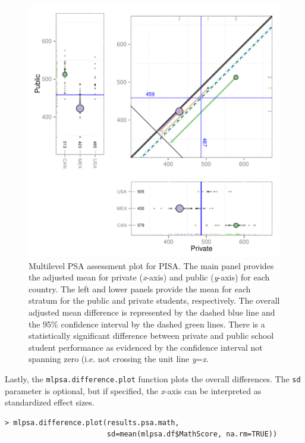 \documentclass[letterpaper,12pt]{article} %
\begin{document}
\setlength{\belowcaptionskip}{-10pt}
\begin{figure}[h!]
\begin{center}
\includegraphics[width=\textwidth]{../Figures/pisamlpsa.pdf}
\caption[Multilevel PSA assessment plot for PISA]{Multilevel PSA assessment plot for PISA. The main panel provides the adjusted mean for private (\textit{x}-axis) and public (\textit{y}-axis) for each country. The left and lower panels provide the mean for each stratum for the public and private students, respectively. The overall adjusted mean difference is represented by the dashed blue line and the 95\% confidence interval by the dashed green lines. There is a statistically significant difference between private and public school student performance as evidenced by the confidence interval not spanning zero (i.e. not crossing the unit line \textit{y}=\textit{x}.}
\end{center}
\end{figure}
\setlength{\belowcaptionskip}{0pt}

\clearpage
Lastly, the \texttt{mlpsa.difference.plot} function plots the overall differences. The \texttt{sd} parameter is optional, but if specified, the \textit{x}-axis can be interpreted as standardized effect sizes.

\begin{verbatim}
> mlpsa.difference.plot(results.psa.math, 
                        sd=mean(mlpsa.df$MathScore, na.rm=TRUE))
\end{verbatim}
\end{document}
